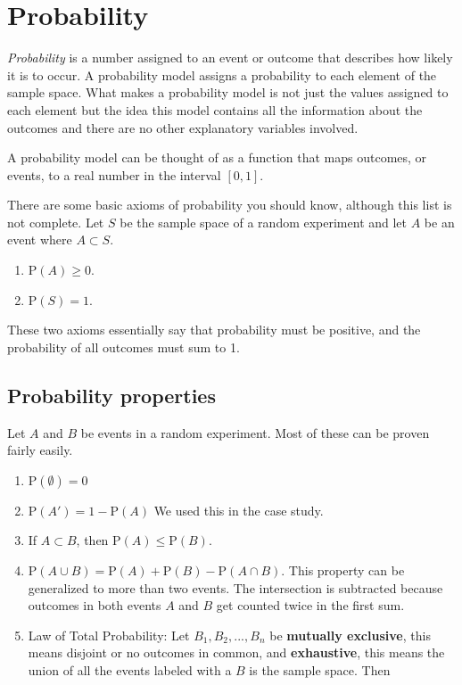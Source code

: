 \documentclass[
  letterpaper,
  DIV=11,
  numbers=noendperiod]{scrreprt}
\begin{document}
\section{Probability}\label{probability}

\emph{Probability} is a number assigned to an event or outcome that
describes how likely it is to occur. A probability model assigns a
probability to each element of the sample space. What makes a
probability model is not just the values assigned to each element but
the idea this model contains all the information about the outcomes and
there are no other explanatory variables involved.

A probability model can be thought of as a function that maps outcomes,
or events, to a real number in the interval \([0,1]\).

There are some basic axioms of probability you should know, although
this list is not complete. Let \(S\) be the sample space of a random
experiment and let \(A\) be an event where \(A\subset S\).

\begin{enumerate}
\def\labelenumi{\arabic{enumi})}
\item
  \(\mbox{P}(A) \geq 0\).
\item
  \(\mbox{P}(S) = 1\).
\end{enumerate}

These two axioms essentially say that probability must be positive, and
the probability of all outcomes must sum to 1.

\subsection{Probability properties}\label{probability-properties}

Let \(A\) and \(B\) be events in a random experiment. Most of these can
be proven fairly easily.

\begin{enumerate}
\def\labelenumi{\arabic{enumi})}
\item
  \(\mbox{P}(\emptyset)=0\)
\item
  \(\mbox{P}(A')=1-\mbox{P}(A)\) We used this in the case study.
\item
  If \(A\subset B\), then \(\mbox{P}(A)\leq \mbox{P}(B)\).
\item
  \(\mbox{P}(A\cup B) = \mbox{P}(A)+\mbox{P}(B)-\mbox{P}(A\cap B)\).
  This property can be generalized to more than two events. The
  intersection is subtracted because outcomes in both events \(A\) and
  \(B\) get counted twice in the first sum.
\item
  Law of Total Probability: Let \(B_1, B_2,...,B_n\) be \textbf{mutually
  exclusive}, this means disjoint or no outcomes in common, and
  \textbf{exhaustive}, this means the union of all the events labeled
  with a \(B\) is the sample space. Then
\end{enumerate}
\end{document}
